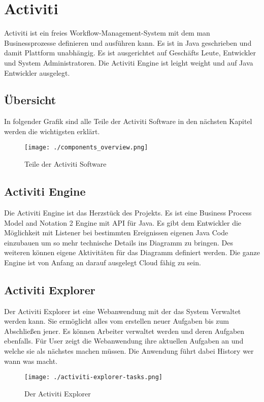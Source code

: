 \section{Activiti}
Activiti ist ein freies Workflow-Management-System mit dem man Businessprozesse definieren und ausführen kann. Es ist in Java geschrieben und damit Plattform unabhängig. Es ist ausgerichtet auf Geschäfts Leute, Entwickler und System Administratoren. Die Activiti Engine ist leight weight und auf Java Entwickler ausgelegt.

\subsection{Übersicht}
In folgender Grafik sind alle Teile der Activiti Software in den nächsten Kapitel werden die wichtigsten erklärt.
\begin{figure}[htbp]
	\centering
		\texttt{[image: ./components\_overview.png]}
	\caption{Teile der Activiti Software}
	\label{fig:ActivitiSWTeile}
\end{figure}

\subsection{Activiti Engine}
Die Activiti Engine ist das Herzstück des Projekts. Es ist eine Business Process Model and Notation 2 Engine mit API für Java. Es gibt dem Entwickler die Möglichkeit mit Listener bei bestimmten Ereignissen eigenen Java Code einzubauen um so mehr technische Details ins Diagramm zu bringen. Des weiteren können eigene Aktivitäten für das Diagramm definiert werden. Die ganze Engine ist von Anfang an darauf ausgelegt Cloud fähig zu sein.

\subsection{Activiti Explorer}
Der Activiti Explorer ist eine Webanwendung mit der das System Verwaltet werden kann. Sie ermöglicht alles vom erstellen neuer Aufgaben bis zum Abschließen jener. Es können Arbeiter verwaltet werden und deren Aufgaben ebenfalls. Für User zeigt die Webanwendung ihre aktuellen Aufgaben an und welche sie als nächstes machen müssen. Die Anwendung führt dabei History wer wann was macht.
\begin{figure}[htbp]
	\centering
		\texttt{[image: ./activiti-explorer-tasks.png]}
	\caption{Der Activiti Explorer}
	\label{fig:ActivitiExplorer}
\end{figure}

